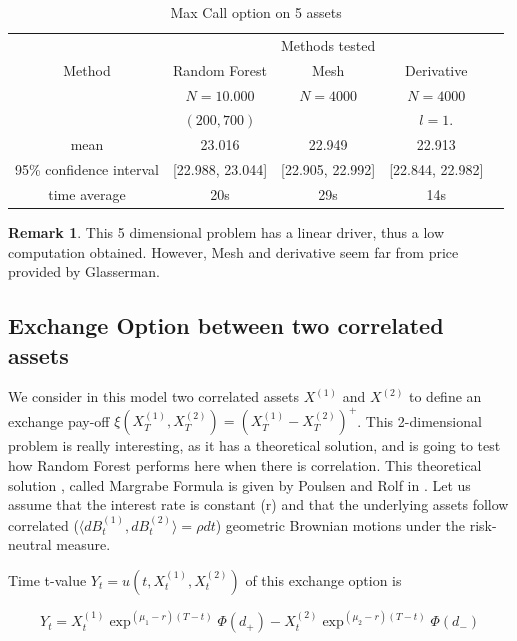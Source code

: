 \documentclass[english,11pt,openany]{report}
\theoremstyle{definition}
\theoremstyle{plain}
\theoremstyle{definition}
\newtheorem{Rem}[Th]{Remark}
\begin{document}
\begin{table}[H]
	\centering

	\begin{tabular}{*5c}
		\toprule
		& \multicolumn{3}{c}{Methods tested} \\
		\cmidrule(lr){2-4}
		Method & Random Forest & Mesh & Derivative \\    
		& $N = 10.000$    & $N = 4 000$ &  $N = 4 000$ \\
		&   $(200, 700)$  &  &  $l=1.$ \\
		\midrule
		mean &     23.016   &  22.949 &  22.913  \\ 
		95\% confidence interval &  [22.988, 23.044]      &  [22.905, 22.992]      & [22.844, 22.982]  \\
		time average &   20s     &  29s & 14s \\
		\bottomrule
	\end{tabular}
	\caption{Max Call option on 5 assets }\label{table:1}
\end{table}

\begin{Rem}
	This 5 dimensional problem has a linear driver, thus a low computation obtained. However, Mesh and derivative seem far from price provided by Glasserman. 
\end{Rem}

\subsection{Exchange Option between two correlated assets}

We consider in this model two correlated assets $X^{(1)}$ and $X^{(2)}$ to define an exchange pay-off $\xi(X^{(1)}_T, X^{(2)}_T) = \left(X^{(1)}_T - X^{(2)}_T\right)^+$. 
This 2-dimensional problem is really interesting, as it has a theoretical solution, and is going to test how Random Forest performs here when there is correlation.
 This theoretical solution , called Margrabe Formula is given by Poulsen and Rolf in \cite{poulsen2009margrabe}. 
Let us assume that the interest rate is constant (r) and that the underlying assets follow correlated ($\langle dB^{(1)}_t, dB^{(2)}_t \rangle =\rho dt$) geometric Brownian motions under the risk-neutral measure. 

Time t-value $Y_t = u(t, X^{(1)}_t, X^{(2)}_t)$ of this exchange option is

\begin{displaymath}
Y_t = X^{(1)}_t \exp^{(\mu_1 - r)(T-t)}\Phi(d_+) - X^{(2)}_t \exp^{(\mu_2 - r)(T-t)}\Phi(d_-)
\end{displaymath}
\end{document}
